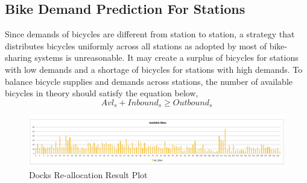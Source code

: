 \documentclass[journal, letterpaper]{IEEEtran}
\begin{document}
\subsection{Bike Demand Prediction For Stations}
Since demands of bicycles are different from station to station, a strategy that distributes bicycles uniformly across all stations as adopted by most of bike-sharing systems is unreasonable. It may create a surplus of bicycles for stations with low demands and a shortage of bicycles for stations with high demands. To balance bicycle supplies and demands across stations, the number of available bicycles in theory should satisfy the equation below,
$$Avl_{s} + Inbound_{s} \ge Outbound_{s}$$




\begin{figure}
  \includegraphics[width=1\textwidth]{availablebike.jpg}
  \caption{Docks Re-allocation Result Plot}
  \label{fig:2}
\end{figure}
\end{document}
